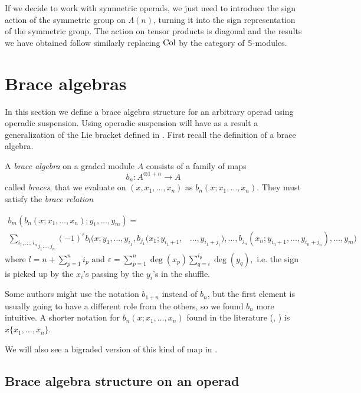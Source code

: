 \documentclass[join.tex]{subfiles}
\begin{document}
\begin{remark}
If we decide to work with symmetric operads, we just need to introduce the sign action of the symmetric group on $\Lambda(n)$, turning it into the sign representation of the symmetric group. The action on tensor products is diagonal and the results we have obtained follow similarly replacing $\mathrm{Col}$ by the category of $\mathbb{S}$-modules.
\end{remark}

\section{Brace algebras}\label{sectionbraces}
In this section we define a brace algebra structure for an arbitrary operad using operadic suspension. Using operadic suspension will have as a result  a generalization of the Lie bracket defined in \cite{RW}. First recall the definition of a brace algebra.

\begin{defin}\label{braces}
A \emph{brace algebra} on a graded module $A$ consists of a family of maps \[b_n:A^{\otimes 1+n}\to A\] called \emph{braces}, that we evaluate on $(x,x_1,\dots, x_n)$ as $b_n(x;x_1,\dots, x_n)$. They must satisfy the \emph{brace relation}


\begin{align*}
b_m(b_n(x;x_1,\dots, x_n);y_1,\dots,y_m)=&\\
\underset{j_1\dots, j_n}{\sum_{i_1,\dots, i_n}}(-1)^{\varepsilon}b_l(x; y_1,\dots, y_{i_1},b_{j_1}(x_1;y_{i_1+1},&\dots, y_{i_1+j_1}),\dots, b_{j_n}(x_n;y_{i_n+1},\dots, y_{i_n+j_n}),\dots,y_m)
\end{align*}
where $l=n+\sum_{p=1}^n i_p$ and $\varepsilon=\sum_{p=1}^n\deg(x_p)\sum_{q=i}^{i_p}\deg(y_q),$ i.e. the sign is picked up by the $x_i$'s passing by the $y_i$'s in the shuffle.
\end{defin}

\begin{remark}
Some authors might use the notation $b_{1+n}$ instead of $b_n$, but the first element is usually going to have a different role from the others, so we found $b_n$ more intuitive. A shorter notation for $b_n(x;x_1,\dots,x_n)$ found in the literature (\cite{GV}, \cite{getzler}) is $x\{x_1,\dots, x_n\}$. 
\end{remark}

We will also see a bigraded version of this kind of map in .
\subsection{Brace algebra structure on an operad}
\end{document}
